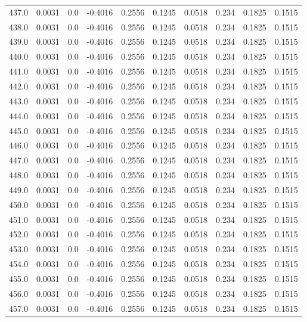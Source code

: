 \begin{longtable}{lrrrrrrrrr}
437.0 & 0.0031 & 0.0 & -0.4016 & 0.2556 & 0.1245 & 0.0518 & 0.234 & 0.1825 & 0.1515 \\
438.0 & 0.0031 & 0.0 & -0.4016 & 0.2556 & 0.1245 & 0.0518 & 0.234 & 0.1825 & 0.1515 \\
439.0 & 0.0031 & 0.0 & -0.4016 & 0.2556 & 0.1245 & 0.0518 & 0.234 & 0.1825 & 0.1515 \\
440.0 & 0.0031 & 0.0 & -0.4016 & 0.2556 & 0.1245 & 0.0518 & 0.234 & 0.1825 & 0.1515 \\
441.0 & 0.0031 & 0.0 & -0.4016 & 0.2556 & 0.1245 & 0.0518 & 0.234 & 0.1825 & 0.1515 \\
442.0 & 0.0031 & 0.0 & -0.4016 & 0.2556 & 0.1245 & 0.0518 & 0.234 & 0.1825 & 0.1515 \\
443.0 & 0.0031 & 0.0 & -0.4016 & 0.2556 & 0.1245 & 0.0518 & 0.234 & 0.1825 & 0.1515 \\
444.0 & 0.0031 & 0.0 & -0.4016 & 0.2556 & 0.1245 & 0.0518 & 0.234 & 0.1825 & 0.1515 \\
445.0 & 0.0031 & 0.0 & -0.4016 & 0.2556 & 0.1245 & 0.0518 & 0.234 & 0.1825 & 0.1515 \\
446.0 & 0.0031 & 0.0 & -0.4016 & 0.2556 & 0.1245 & 0.0518 & 0.234 & 0.1825 & 0.1515 \\
447.0 & 0.0031 & 0.0 & -0.4016 & 0.2556 & 0.1245 & 0.0518 & 0.234 & 0.1825 & 0.1515 \\
448.0 & 0.0031 & 0.0 & -0.4016 & 0.2556 & 0.1245 & 0.0518 & 0.234 & 0.1825 & 0.1515 \\
449.0 & 0.0031 & 0.0 & -0.4016 & 0.2556 & 0.1245 & 0.0518 & 0.234 & 0.1825 & 0.1515 \\
450.0 & 0.0031 & 0.0 & -0.4016 & 0.2556 & 0.1245 & 0.0518 & 0.234 & 0.1825 & 0.1515 \\
451.0 & 0.0031 & 0.0 & -0.4016 & 0.2556 & 0.1245 & 0.0518 & 0.234 & 0.1825 & 0.1515 \\
452.0 & 0.0031 & 0.0 & -0.4016 & 0.2556 & 0.1245 & 0.0518 & 0.234 & 0.1825 & 0.1515 \\
453.0 & 0.0031 & 0.0 & -0.4016 & 0.2556 & 0.1245 & 0.0518 & 0.234 & 0.1825 & 0.1515 \\
454.0 & 0.0031 & 0.0 & -0.4016 & 0.2556 & 0.1245 & 0.0518 & 0.234 & 0.1825 & 0.1515 \\
455.0 & 0.0031 & 0.0 & -0.4016 & 0.2556 & 0.1245 & 0.0518 & 0.234 & 0.1825 & 0.1515 \\
456.0 & 0.0031 & 0.0 & -0.4016 & 0.2556 & 0.1245 & 0.0518 & 0.234 & 0.1825 & 0.1515 \\
457.0 & 0.0031 & 0.0 & -0.4016 & 0.2556 & 0.1245 & 0.0518 & 0.234 & 0.1825 & 0.1515 \\

\end{longtable}

